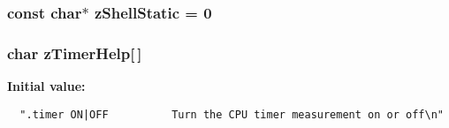 \subsubsection{\setlength{\rightskip}{0pt plus 5cm}const char$\ast$ \bf{z\-Shell\-Static} = 0\hspace{0.3cm}{\tt  [static]}}\label{3_87_83_2shell_8c_7fcc02f813362fbca7ab2966c6abc6ff}


\subsubsection{\setlength{\rightskip}{0pt plus 5cm}char \bf{z\-Timer\-Help}[$\,$]\hspace{0.3cm}{\tt  [static]}}\label{3_87_83_2shell_8c_bdc9ce25e5f1de0d6821fdd674f8b486}


\textbf{Initial value:}

\begin{Code}\begin{verbatim}
  ".timer ON|OFF          Turn the CPU timer measurement on or off\n"
\end{verbatim}\end{Code}
